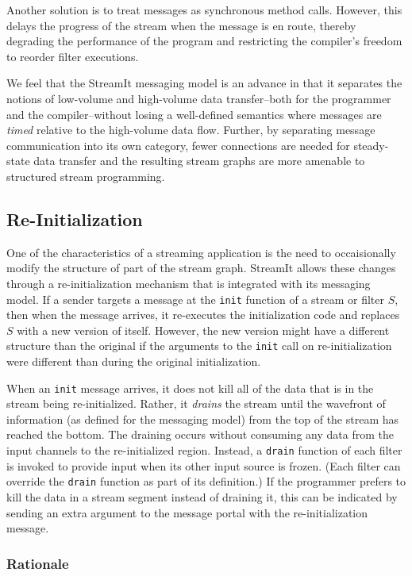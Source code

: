 Another solution is to treat messages as synchronous method calls.
However, this delays the progress of the stream when the message is en
route, thereby degrading the performance of the program and
restricting the compiler's freedom to reorder filter executions.  

We feel that the StreamIt messaging model is an advance in that it
separates the notions of low-volume and high-volume data transfer--both
for the programmer and the compiler--without losing a well-defined
semantics where messages are {\it timed} relative to the high-volume
data flow.  Further, by separating message communication into its own
category, fewer connections are needed for steady-state data transfer
and the resulting stream graphs are more amenable to structured stream
programming.

\subsection{Re-Initialization}
\label{sec:reinit}

One of the characteristics of a streaming application is the need to
occaisionally modify the structure of part of the stream graph.
StreamIt allows these changes through a re-initialization mechanism that
is integrated with its messaging model.  If a sender targets a message
at the {\tt init} function of a stream or filter $S$, then when the
message arrives, it re-executes the initialization code and replaces $S$
with a new version of itself.  However, the new version might have a
different structure than the original if the arguments to the {\tt init}
call on re-initialization were different than during the original
initialization.

When an {\tt init} message arrives, it does not kill all of the data
that is in the stream being re-initialized.  Rather, it {\it drains}
the stream until the wavefront of information (as defined for the
messaging model) from the top of the stream has reached the bottom.
The draining occurs without consuming any data from the input channels
to the re-initialized region.  Instead, a {\tt drain} function of each
filter is invoked to provide input when its other input source is
frozen.  (Each filter can override the {\tt drain} function as part of
its definition.)  If the programmer prefers to kill the data in a
stream segment instead of draining it, this can be indicated by
sending an extra argument to the message portal with the
re-initialization message.

\subsubsection{Rationale}

